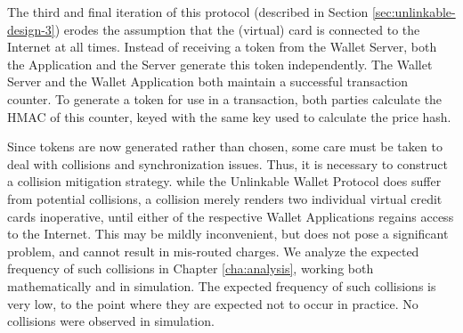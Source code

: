 The third and final iteration of this protocol (described in Section \ref{sec:unlinkable-design-3}) erodes the assumption that the (virtual) card is connected to the Internet at all times.
Instead of receiving a token from the Wallet Server, both the Application and the Server generate this token independently.
The Wallet Server and the Wallet Application both maintain a successful transaction counter.
To generate a token for use in a transaction, both parties calculate the HMAC of this counter, keyed with the same key used to calculate the price hash.


Since tokens are now generated rather than chosen, some care must be taken to deal with collisions and synchronization issues.
Thus, it is necessary to construct a collision mitigation strategy.
while the Unlinkable Wallet Protocol does suffer from potential collisions,
    a collision merely renders two individual virtual credit cards inoperative, until either of the respective Wallet Applications regains access to the Internet.
This may be mildly inconvenient, but does not pose a significant problem, and cannot result in mis-routed charges.
We analyze the expected frequency of such collisions in Chapter \ref{cha:analysis}, working both mathematically and in simulation.
The expected frequency of such collisions is very low, to the point where they are expected not to occur in practice.
No collisions were observed in simulation.
